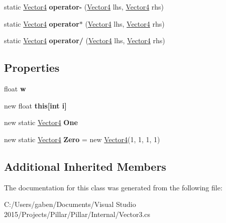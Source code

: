 \begin{DoxyCompactItemize}
\item 
\mbox{\label{class_pillar3_d_1_1_vector4_a8c79df7ed45d874bffc588fded8e92ce}} 
static \hyperlink{class_pillar3_d_1_1_vector4}{Vector4} {\bfseries operator-\/} (\hyperlink{class_pillar3_d_1_1_vector4}{Vector4} lhs, \hyperlink{class_pillar3_d_1_1_vector4}{Vector4} rhs)
\item 
\mbox{\label{class_pillar3_d_1_1_vector4_a34c76a6cbe111817e0210b20f89b4d1c}} 
static \hyperlink{class_pillar3_d_1_1_vector4}{Vector4} {\bfseries operator$\ast$} (\hyperlink{class_pillar3_d_1_1_vector4}{Vector4} lhs, \hyperlink{class_pillar3_d_1_1_vector4}{Vector4} rhs)
\item 
\mbox{\label{class_pillar3_d_1_1_vector4_af92df8988fbb92ca343197ec9df2463e}} 
static \hyperlink{class_pillar3_d_1_1_vector4}{Vector4} {\bfseries operator/} (\hyperlink{class_pillar3_d_1_1_vector4}{Vector4} lhs, \hyperlink{class_pillar3_d_1_1_vector4}{Vector4} rhs)
\end{DoxyCompactItemize}
\subsection*{Properties}
\begin{DoxyCompactItemize}
\item 
\mbox{\label{class_pillar3_d_1_1_vector4_a2d14ea5dc05dde08aebf14259afeabc2}} 
float {\bfseries w}
\item 
\mbox{\label{class_pillar3_d_1_1_vector4_a3f752ca954d46d55d52008a05534d02e}} 
new float {\bfseries this\mbox{[}int i\mbox{]}}
\item 
\mbox{\label{class_pillar3_d_1_1_vector4_a8f1a2a0bd0fcd6cc71ef7681e3e7d8a2}} 
new static \hyperlink{class_pillar3_d_1_1_vector4}{Vector4} {\bfseries One}
\item 
\mbox{\label{class_pillar3_d_1_1_vector4_a8662ba4a2c8630be13485e595e0c779a}} 
new static \hyperlink{class_pillar3_d_1_1_vector4}{Vector4} {\bfseries Zero} = new \hyperlink{class_pillar3_d_1_1_vector4}{Vector4}(1, 1, 1, 1)
\end{DoxyCompactItemize}
\subsection*{Additional Inherited Members}


The documentation for this class was generated from the following file\+:\begin{DoxyCompactItemize}
\item 
C\+:/\+Users/gaben/\+Documents/\+Visual Studio 2015/\+Projects/\+Pillar/\+Pillar/\+Internal/Vector3.\+cs\end{DoxyCompactItemize}
